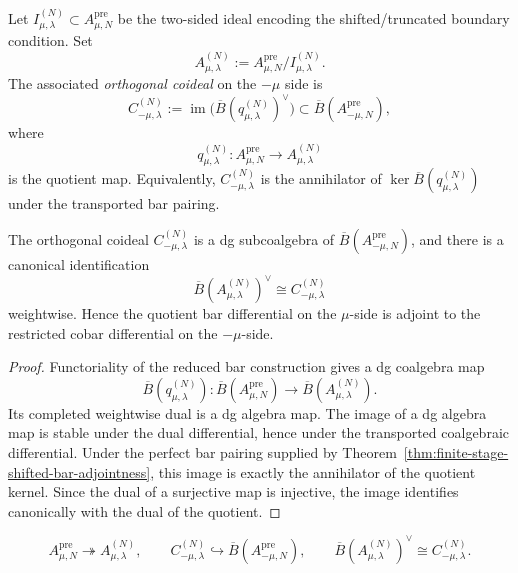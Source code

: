 \begin{definition}
\label{def:boundary-quotient-orthogonal-coideal}
Let $I_{\mu,\lambda}^{(N)}\subset A_{\mu,N}^{\mathrm{pre}}$ be the two-sided ideal
encoding the shifted/truncated boundary condition.  Set
\[
A_{\mu,\lambda}^{(N)}:=A_{\mu,N}^{\mathrm{pre}}/I_{\mu,\lambda}^{(N)}.
\]
The associated \emph{orthogonal coideal} on the $-\mu$ side is
\[
C_{-\mu,\lambda}^{(N)}
:=
\operatorname{im}\bigl(\overline{B}(q_{\mu,\lambda}^{(N)})^\vee\bigr)
\subset \overline{B}(A_{-\mu,N}^{\mathrm{pre}}),
\]
where
\[
q_{\mu,\lambda}^{(N)}\colon A_{\mu,N}^{\mathrm{pre}}\to A_{\mu,\lambda}^{(N)}
\]
is the quotient map.  Equivalently, $C_{-\mu,\lambda}^{(N)}$ is the annihilator of
$\ker \overline{B}(q_{\mu,\lambda}^{(N)})$ under the transported bar pairing.
\end{definition}

\begin{theorem}
\label{thm:quotient-coideal-descent}
The orthogonal coideal $C_{-\mu,\lambda}^{(N)}$ is a dg subcoalgebra of
$\overline{B}(A_{-\mu,N}^{\mathrm{pre}})$, and there is a canonical
identification
\[
\overline{B}(A_{\mu,\lambda}^{(N)})^\vee\cong C_{-\mu,\lambda}^{(N)}
\]
weightwise.  Hence the quotient bar differential on the $\mu$-side is adjoint to
the restricted cobar differential on the $-\mu$-side.
\end{theorem}

\begin{proof}
Functoriality of the reduced bar construction gives a dg coalgebra map
\[
\overline{B}(q_{\mu,\lambda}^{(N)})\colon
\overline{B}(A_{\mu,N}^{\mathrm{pre}})\to \overline{B}(A_{\mu,\lambda}^{(N)}).
\]
Its completed weightwise dual is a dg algebra map.  The image of a dg algebra
map is stable under the dual differential, hence under the transported
coalgebraic differential.  Under the perfect bar pairing supplied by
Theorem~\ref{thm:finite-stage-shifted-bar-adjointness}, this image is exactly the
annihilator of the quotient kernel.  Since the dual of a surjective map is
injective, the image identifies canonically with the dual of the quotient.
\end{proof}

\[
A_{\mu,N}^{\mathrm{pre}}\twoheadrightarrow A_{\mu,\lambda}^{(N)},
\qquad
C_{-\mu,\lambda}^{(N)}\hookrightarrow \overline{B}(A_{-\mu,N}^{\mathrm{pre}}),
\qquad
\overline{B}(A_{\mu,\lambda}^{(N)})^\vee\cong C_{-\mu,\lambda}^{(N)}.
\]

